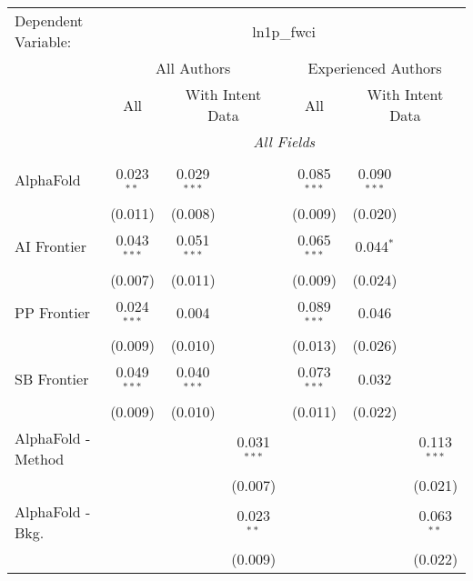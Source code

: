 \begingroup
\centering
\begin{tabular}{lcccccc}
   \tabularnewline \midrule \midrule
   Dependent Variable: & \multicolumn{6}{c}{ln1p\_fwci}\\
 & \multicolumn{3}{c}{All Authors} & \multicolumn{3}{c}{Experienced Authors} \\
\cmidrule(lr){2-4} \cmidrule(lr){5-7}
 & \multicolumn{1}{c}{All} & \multicolumn{2}{c}{With Intent Data} & \multicolumn{1}{c}{All} & \multicolumn{2}{c}{With Intent Data} \\
\cmidrule(lr){2-2} \cmidrule(lr){3-4} \cmidrule(lr){5-5} \cmidrule(lr){6-7}
 & \multicolumn{6}{c}{\textit{All Fields}} \\ \\
   AlphaFold            & 0.023$^{**}$  & 0.029$^{***}$ &               & 0.085$^{***}$ & 0.090$^{***}$ &   \\   
                        & (0.011)       & (0.008)       &               & (0.009)       & (0.020)       &   \\   
   AI Frontier          & 0.043$^{***}$ & 0.051$^{***}$ &               & 0.065$^{***}$ & 0.044$^{*}$   &   \\   
                        & (0.007)       & (0.011)       &               & (0.009)       & (0.024)       &   \\   
   PP Frontier          & 0.024$^{***}$ & 0.004         &               & 0.089$^{***}$ & 0.046         &   \\   
                        & (0.009)       & (0.010)       &               & (0.013)       & (0.026)       &   \\   
   SB Frontier          & 0.049$^{***}$ & 0.040$^{***}$ &               & 0.073$^{***}$ & 0.032         &   \\   
                        & (0.009)       & (0.010)       &               & (0.011)       & (0.022)       &   \\   
   AlphaFold - Method   &               &               & 0.031$^{***}$ &               &               & 0.113$^{***}$\\   
                        &               &               & (0.007)       &               &               & (0.021)\\   
   AlphaFold - Bkg.     &               &               & 0.023$^{**}$  &               &               & 0.063$^{**}$\\   
                        &               &               & (0.009)       &               &               & (0.022)\\   

\end{tabular}
